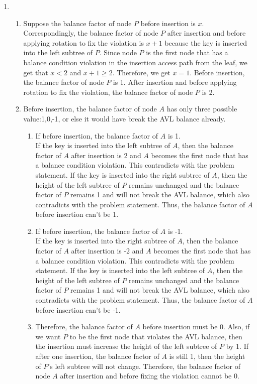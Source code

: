 \documentclass[12pt,a4paper]{article}
\makeatletter
\newtheorem*{solution}{Solution}
\theoremstyle{definition}
\renewenvironment{solution}[1][Solution] {\par\pushQED{\qed}\normalfont\topsep6\p@\@plus6\p@\relax\trivlist\item[\hskip\labelsep\bfseries#1\@addpunct{.}]\ignorespaces}{\popQED\endtrivlist\@endpefalse} \makeatother
\makeatother
\begin{document}
\begin{enumerate}
\begin{solution}
\quad\\
\begin{enumerate}
\item
Suppose the balance factor of node $P$ before insertion is $x$. Correspondingly, the balance factor of node $P$ after insertion and before applying rotation to fix the violation is $x+1$ because the key is inserted into the left subtree of $P$. Since node $P$ is the first node that has a balance condition violation in the insertion access path from the leaf, we get that $x<2$ and $x+1\geq2$. Therefore, we get $x=1$. Before insertion, the balance factor of node $P$ is 1. After insertion and before applying rotation to fix the violation, the balance factor of node $P$ is 2.
\item
Before insertion, the balance factor of node $A$ has only three possible value:1,0,-1, or else it would have break the AVL balance already.
\begin{enumerate}
\item
If before insertion, the balance factor of $A$ is 1.\\
If the key is inserted into the left subtree of $A$, then the balance factor of $A$ after insertion is 2 and $A$ becomes the first node that has a balance condition violation. This contradicts with the problem statement. If the key is inserted into the right subtree of $A$, then the height of the left subtree of $P$ remains unchanged and the balance factor of $P$ remains 1 and will not break the AVL balance, which also contradicts with the problem statement. Thus, the balance factor of $A$ before insertion can't be 1.
\item
If before insertion, the balance factor of $A$ is -1.\\
If the key is inserted into the right subtree of $A$, then the balance factor of $A$ after insertion is -2 and $A$ becomes the first node that has a balance condition violation. This contradicts with the problem statement. If the key is inserted into the left subtree of $A$, then the height of the left subtree of $P$ remains unchanged and the balance factor of $P$ remains 1 and will not break the AVL balance, which also contradicts with the problem statement. Thus, the balance factor of $A$ before insertion can't be -1.
\item
Therefore, the balance factor of $A$ before insertion must be 0. Also, if we want $P$ to be the first node that violates the AVL balance, then the insertion must increase the height of the left subtree of $P$ by 1. If after one insertion, the balance factor of $A$ is still 1, then the height of $P$'s left subtree will not change. Therefore, the balance factor of node $A$ after insertion and before fixing the violation cannot be 0.
\end{enumerate}
\end{enumerate}
\end{solution}

\end{enumerate}

\end{document}
